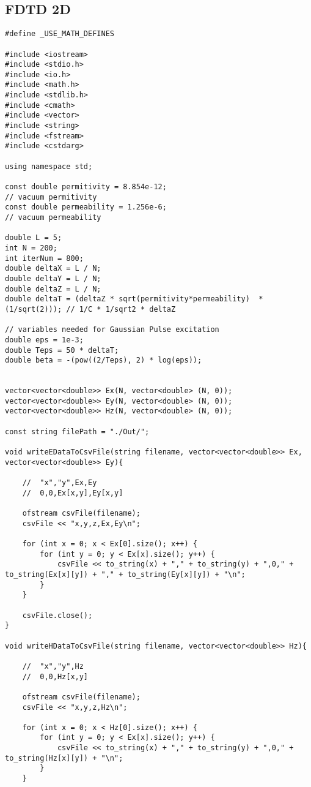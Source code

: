 \subsection{FDTD 2D}

\begin{verbatim}
#define _USE_MATH_DEFINES

#include <iostream>
#include <stdio.h>
#include <io.h>
#include <math.h>
#include <stdlib.h>
#include <cmath>
#include <vector>
#include <string>
#include <fstream>
#include <cstdarg>

using namespace std;

const double permitivity = 8.854e-12;												// vacuum permitivity
const double permeability = 1.256e-6; 								                // vacuum permeability

double L = 5;
int N = 200;
int iterNum = 800;
double deltaX = L / N;
double deltaY = L / N;
double deltaZ = L / N;
double deltaT = (deltaZ * sqrt(permitivity*permeability)  * (1/sqrt(2))); // 1/C * 1/sqrt2 * deltaZ

// variables needed for Gaussian Pulse excitation
double eps = 1e-3;
double Teps = 50 * deltaT;
double beta = -(pow((2/Teps), 2) * log(eps));


vector<vector<double>> Ex(N, vector<double> (N, 0));
vector<vector<double>> Ey(N, vector<double> (N, 0));
vector<vector<double>> Hz(N, vector<double> (N, 0));

const string filePath = "./Out/";

void writeEDataToCsvFile(string filename, vector<vector<double>> Ex, vector<vector<double>> Ey){
	
	//	"x","y",Ex,Ey
	//	0,0,Ex[x,y],Ey[x,y]
	
	ofstream csvFile(filename);
	csvFile << "x,y,z,Ex,Ey\n";
	
	for (int x = 0; x < Ex[0].size(); x++) {
		for (int y = 0; y < Ex[x].size(); y++) {
			csvFile << to_string(x) + "," + to_string(y) + ",0," + to_string(Ex[x][y]) + "," + to_string(Ey[x][y]) + "\n";
		}
	}
	
	csvFile.close();
}

void writeHDataToCsvFile(string filename, vector<vector<double>> Hz){
	
	//	"x","y",Hz
	//	0,0,Hz[x,y]
	
	ofstream csvFile(filename);
	csvFile << "x,y,z,Hz\n";
	
	for (int x = 0; x < Hz[0].size(); x++) {
		for (int y = 0; y < Ex[x].size(); y++) {
			csvFile << to_string(x) + "," + to_string(y) + ",0," + to_string(Hz[x][y]) + "\n";
		}
	}
	

\end{verbatim}
